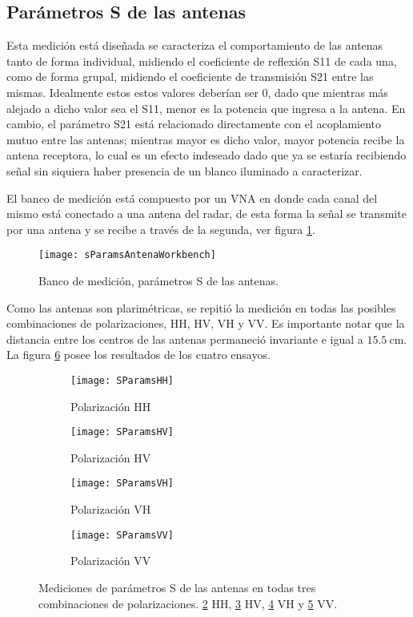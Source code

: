 \subsection{Parámetros S de las antenas}

Esta medición está diseñada se caracteriza el comportamiento de las antenas tanto de forma individual, midiendo el coeficiente de reflexión S11 de cada una, como de forma grupal, midiendo el coeficiente de transmisión S21 entre las mismas. Idealmente estos estos valores deberían ser 0, dado que mientras más alejado a dicho valor sea el S11, menor es la potencia que ingresa a la antena. En cambio, el parámetro S21 está relacionado directamente con el acoplamiento mutuo entre las antenas; mientras mayor es dicho valor, mayor potencia recibe la antena receptora, lo cual es un efecto indeseado dado que ya se estaría recibiendo señal sin siquiera haber presencia de un blanco iluminado a caracterizar.

El banco de medición está compuesto por un VNA en donde cada canal del mismo está conectado a una antena del radar, de esta forma  la señal se transmite por una antena y se recibe a través de la segunda, ver figura \ref{fig:sParamsConnections}.
\begin{figure}[H]
 \centering
 \texttt{[image: sParamsAntenaWorkbench]}
 \caption{Banco de medición, parámetros S de las antenas.}
 \label{fig:sParamsConnections}
\end{figure}

Como las antenas son plarimétricas, se repitió la medición en todas las posibles combinaciones de polarizaciones, HH, HV, VH y VV. Es importante notar que la distancia entre los centros de las antenas permaneció invariante e igual a $\SI{15.5}{\centi\meter}$. La figura \ref{fig:sParametersMeasurements} posee los resultados de los cuatro ensayos.

\begin{figure}[H]
  \centering
  \begin{subfigure}{0.47\textwidth}
    \centering
    \texttt{[image: SParamsHH]}
    \caption{Polarización HH}
    \label{subfig:hhPol}
  \end{subfigure}
  \begin{subfigure}{0.47\textwidth}
    \centering
    \texttt{[image: SParamsHV]}
    \caption{Polarización HV}
    \label{subfig:hvPol}
  \end{subfigure}

  \begin{subfigure}{0.47\textwidth}
    \centering
    \texttt{[image: SParamsVH]}
    \caption{Polarización VH}
    \label{subfig:vhPol}
  \end{subfigure}
  \begin{subfigure}{0.47\textwidth}
    \centering
    \texttt{[image: SParamsVV]}
    \caption{Polarización VV}
    \label{subfig:vvPol}
  \end{subfigure}
  \caption{Mediciones de parámetros S de las antenas en todas tres combinaciones de polarizaciones. \ref{subfig:hhPol} HH, \ref{subfig:hvPol} HV, \ref{subfig:vhPol} VH y \ref{subfig:vvPol} VV.}
  \label{fig:sParametersMeasurements}
\end{figure}

